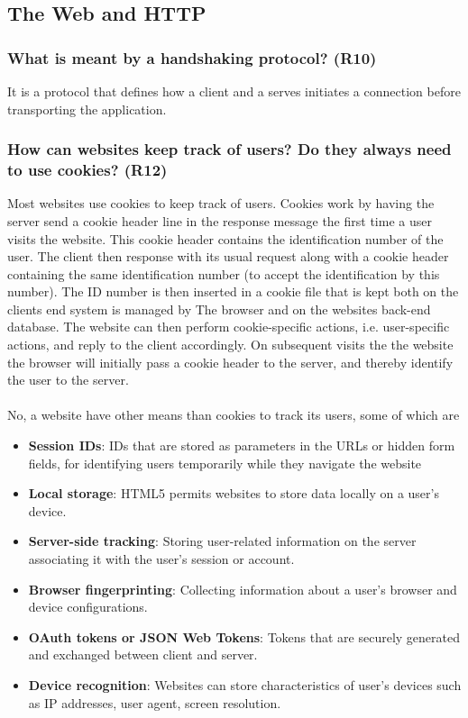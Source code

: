 \subsection{The Web and HTTP}


\subsubsection{What is meant by a handshaking protocol? (R10)}
It is a protocol that defines how a client and a serves initiates a connection before transporting the application.


\subsubsection{How can websites keep track of users? Do they always need to use cookies? (R12)}
Most websites use cookies to keep track of users. Cookies work by having the server send a cookie header line in the response message the first time a user visits the website. This cookie header contains the identification number of the user. The client then response with its usual request along with a cookie header containing the same identification number (to accept the identification by this number). The ID number is then inserted in a cookie file that is kept both on the clients end system is managed by The browser and on the websites back-end database. The website can then perform cookie-specific actions, i.e. user-specific actions, and reply to the client accordingly. On subsequent visits the the website the browser will initially pass a cookie header to the server, and thereby identify the user to the server. \\
\\
No, a website have other means than cookies to track its users, some of which are
\begin{itemize}
    \item \textbf{Session IDs}: IDs that are stored as parameters in the URLs or hidden form fields, for identifying users temporarily while they navigate the website
    \item \textbf{Local storage}: HTML5 permits websites to store data locally on a user's device.
    \item \textbf{Server-side tracking}: Storing user-related information on the server associating it with the user's session or account.
    \item \textbf{Browser fingerprinting}: Collecting information about a user's browser and device configurations.
    \item \textbf{OAuth tokens or JSON Web Tokens}: Tokens that are securely generated and exchanged between client and server.
    \item \textbf{Device recognition}: Websites can store characteristics of user's devices such as IP addresses, user agent, screen resolution.
\end{itemize}


